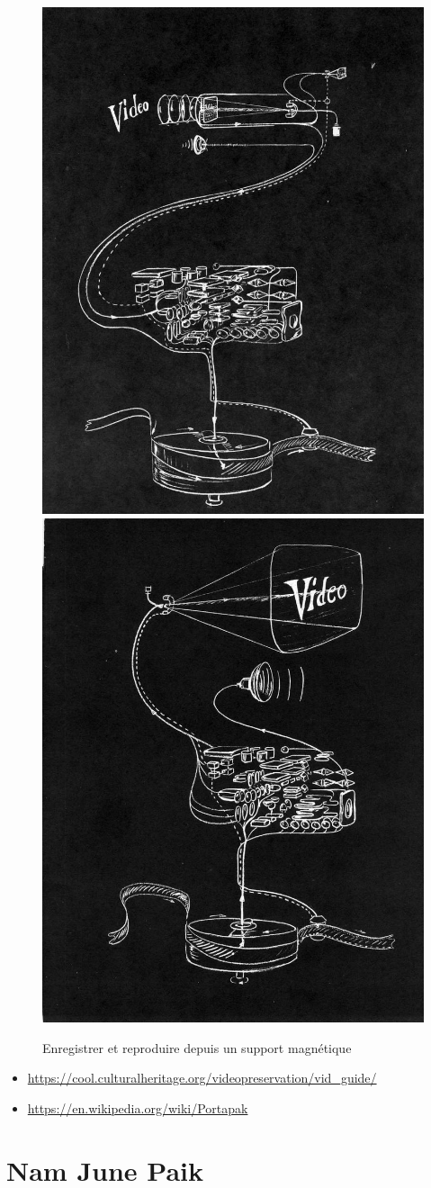 \documentclass[
]{book}
\providecommand{\tightlist}{%
  \setlength{\itemsep}{0pt}\setlength{\parskip}{0pt}}
\begin{document}
\begin{figure}

{\centering \includegraphics[width=0.49\linewidth]{medias/corpus/1960/Charles_Bensinger_video_guide_2} \includegraphics[width=0.49\linewidth]{medias/corpus/1960/Charles_Bensinger_video_guide_3} 

}

\caption{Enregistrer et reproduire depuis un support magnétique}\label{fig:unnamed-chunk-3}
\end{figure}

\begin{itemize}
\tightlist
\item
  \url{https://cool.culturalheritage.org/videopreservation/vid_guide/}
\item
  \url{https://en.wikipedia.org/wiki/Portapak}
\end{itemize}

\hypertarget{nam-june-paik}{%
\section{Nam June Paik}\label{nam-june-paik}}
\end{document}
